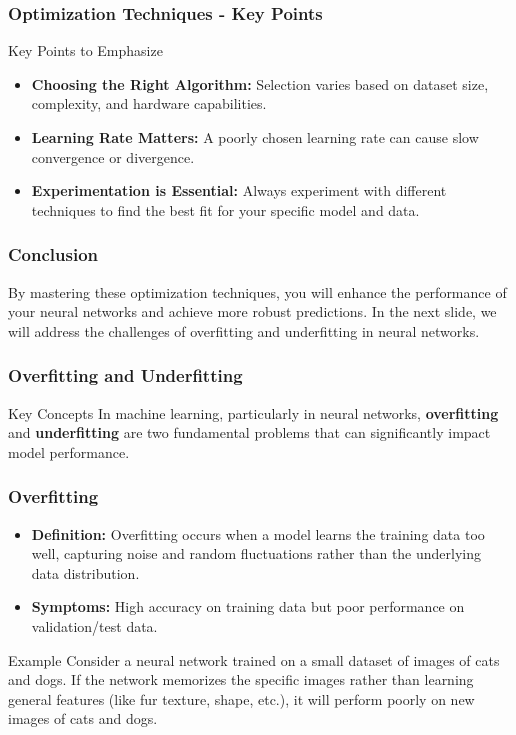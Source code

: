 \documentclass[aspectratio=169]{beamer}
\begin{document}
\begin{frame}[fragile]
    \frametitle{Optimization Techniques - Key Points}
    \begin{block}{Key Points to Emphasize}
        \begin{itemize}
            \item \textbf{Choosing the Right Algorithm:} Selection varies based on dataset size, complexity, and hardware capabilities.
            \item \textbf{Learning Rate Matters:} A poorly chosen learning rate can cause slow convergence or divergence.
            \item \textbf{Experimentation is Essential:} Always experiment with different techniques to find the best fit for your specific model and data.
        \end{itemize}
    \end{block}
\end{frame}

\begin{frame}[fragile]
    \frametitle{Conclusion}
    By mastering these optimization techniques, you will enhance the performance of your neural networks and achieve more robust predictions. In the next slide, we will address the challenges of overfitting and underfitting in neural networks.
\end{frame}

\begin{frame}[fragile]
    \frametitle{Overfitting and Underfitting}
    \begin{block}{Key Concepts}
        In machine learning, particularly in neural networks, \textbf{overfitting} and \textbf{underfitting} are two fundamental problems that can significantly impact model performance.
    \end{block}
\end{frame}

\begin{frame}[fragile]
    \frametitle{Overfitting}
    \begin{itemize}
        \item \textbf{Definition:} Overfitting occurs when a model learns the training data too well, capturing noise and random fluctuations rather than the underlying data distribution.
        \item \textbf{Symptoms:} High accuracy on training data but poor performance on validation/test data.
    \end{itemize}
    \begin{block}{Example}
        Consider a neural network trained on a small dataset of images of cats and dogs. If the network memorizes the specific images rather than learning general features (like fur texture, shape, etc.), it will perform poorly on new images of cats and dogs.
    \end{block}
\end{frame}
\end{document}
